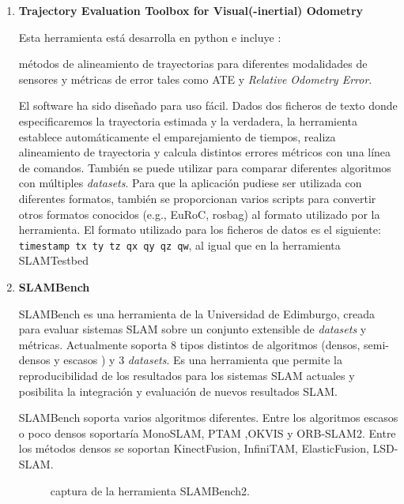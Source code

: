 \begin {enumerate}


\item \textbf{Trajectory Evaluation Toolbox for Visual(-inertial) Odometry}

Esta herramienta está desarrolla en python e incluye : 

métodos de alineamiento de trayectorias para diferentes modalidades de sensores y métricas de error tales como ATE y \textit{Relative Odometry Error}. \cite{Zhang18iros}

El software ha sido diseñado para uso fácil. Dados dos ficheros de texto donde especificaremos la trayectoria estimada y la verdadera, la herramienta establece automáticamente el emparejamiento de tiempos, realiza alineamiento de trayectoria y calcula distintos errores métricos con una línea de comandos. También se puede utilizar para comparar diferentes algoritmos con múltiples \textit{datasets}. Para que la aplicación pudiese ser utilizada con diferentes formatos, también se proporcionan varios scripts para convertir otros formatos conocidos (e.g., EuRoC, rosbag) al formato utilizado por la herramienta.
El formato utilizado para los ficheros de datos es el siguiente: \texttt{timestamp tx ty tz qx qy qz qw}, al igual que en la herramienta SLAMTestbed

\item \textbf{SLAMBench}

SLAMBench es una herramienta de la Universidad de Edimburgo, creada para evaluar sistemas SLAM sobre un conjunto extensible de \textit{datasets} y métricas. \cite{Bodin2018}
Actualmente soporta 8 tipos distintos de algoritmos (densos, semi-densos y escasos ) y 3 \textit{datasets}. Es una herramienta que permite la reproducibilidad de los resultados para los sistemas SLAM actuales y posibilita la integración y evaluación de nuevos resultados SLAM.

SLAMBench soporta varios algoritmos diferentes. Entre los algoritmos escasos o poco densos soportaría MonoSLAM, PTAM ,OKVIS y ORB-SLAM2. Entre los métodos densos se soportan KinectFusion, InfiniTAM, ElasticFusion, LSD-SLAM.
\begin{figure}[H]
\begin{center}
\end{center}
\caption{captura de la herramienta SLAMBench2.}
\end{figure}


\end{enumerate}

